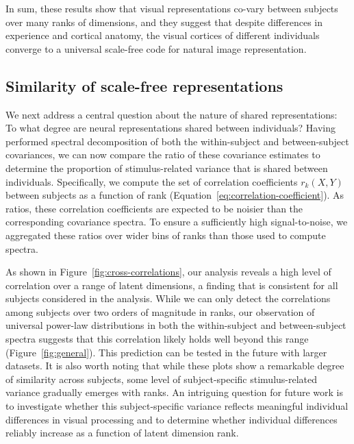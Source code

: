 \documentclass[10pt]{article}
\begin{document}
In sum, these results show that visual representations co-vary between subjects over many ranks of dimensions, and they suggest that despite differences in experience and cortical anatomy, the visual cortices of different individuals converge to a universal scale-free code for natural image representation.

\subsection{Similarity of scale-free representations}\label{sec:similarity-of-scale-free-representations}

We next address a central question about the nature of shared representations: To what degree are neural representations shared between individuals? Having performed spectral decomposition of both the within-subject and between-subject covariances, we can now compare the ratio of these covariance estimates to determine the proportion of stimulus-related variance that is shared between individuals. Specifically, we compute the set of correlation coefficients \(r_k(X, Y)\) between subjects as a function of rank (Equation~\ref{eq:correlation-coefficient}). As ratios, these correlation coefficients are expected to be noisier than the corresponding covariance spectra. To ensure a sufficiently high signal-to-noise, we aggregated these ratios over wider bins of ranks than those used to compute spectra.

As shown in Figure~\ref{fig:cross-correlations}, our analysis reveals a high level of correlation over a range of latent dimensions, a finding that is consistent for all subjects considered in the analysis. While we can only detect the correlations among subjects over two orders of magnitude in ranks, our observation of universal power-law distributions in both the within-subject and between-subject spectra suggests that this correlation likely holds well beyond this range (Figure~\ref{fig:general}). This prediction can be tested in the future with larger datasets. It is also worth noting that while these plots show a remarkable degree of similarity across subjects, some level of subject-specific stimulus-related variance gradually emerges with ranks. An intriguing question for future work is to investigate whether this subject-specific variance reflects meaningful individual differences in visual processing and to determine whether individual differences reliably increase as a function of latent dimension rank.
\end{document}
